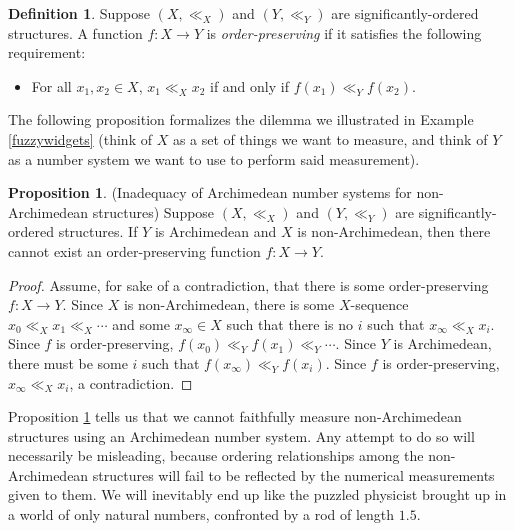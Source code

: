 \documentclass[reqno]{article}
\theoremstyle{definition}
\newtheorem{proposition}[theorem]{Proposition}
\newtheorem{definition}{Definition}
\begin{document}
\begin{definition}
    Suppose $(X,\ll_X)$ and $(Y,\ll_Y)$
    are significantly-ordered structures.
    A function $f:X\to Y$ is \emph{order-preserving} if it satisfies the following
    requirement:
    \begin{itemize}
        \item
            For all $x_1,x_2\in X$, $x_1\ll_X x_2$ if and only if
            $f(x_1)\ll_Yf(x_2)$.
    \end{itemize}
\end{definition}

The following proposition formalizes the dilemma we illustrated in
Example \ref{fuzzywidgets} (think of $X$ as a set of things we
want to measure, and think of $Y$ as a number system we want to use to
perform said measurement).

\begin{proposition}
\label{maindilemma}
(Inadequacy of Archimedean number systems for non-Archimedean structures)
    Suppose $(X,\ll_X)$ and $(Y,\ll_Y)$
    are significantly-ordered structures.
    If $Y$ is Archimedean and $X$ is non-Archimedean, then there cannot exist
    an order-preserving function $f:X\to Y$.
\end{proposition}

\begin{proof}
    Assume, for sake of a contradiction, that there is some order-preserving
    $f:X\to Y$.
    Since $X$ is non-Archimedean, there is some $X$-sequence
    $x_0\ll_X x_1\ll_X \cdots$ and some
    $x_\infty\in X$ such that there is no $i$ such that $x_\infty\ll_X x_i$.
    Since $f$ is order-preserving,
    $f(x_0)\ll_Y f(x_1) \ll_Y \cdots$.
    Since $Y$ is Archimedean, there must be some $i$ such that
    $f(x_\infty)\ll_Y f(x_i)$.
    Since $f$ is order-preserving, $x_\infty\ll_X x_i$, a contradiction.
\end{proof}

Proposition \ref{maindilemma} tells us that we cannot faithfully measure
non-Archimedean structures using an Archimedean number system.
Any attempt to do so will necessarily be misleading, because ordering
relationships among the non-Archimedean structures will fail to be reflected
by the numerical measurements given to them.
We will inevitably end up like the puzzled physicist
brought up in a world of only natural numbers, confronted by a rod of
length $1.5$.
\end{document}
